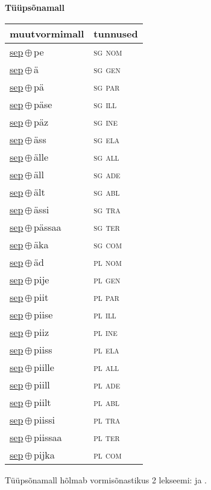 

\vspace{3.5em}
\noindent \begin{minipage}{\textwidth}
\noindent \textbf{Tüüpsõnamall \,}\\

\begin{sideways}
\begin{tabular}{l l}
muutvormimall & tunnused \\
\hline
\underline{sep}\,$\oplus$\,pe & \textsc{ sg nom } \\
\underline{sep}\,$\oplus$\,ä & \textsc{ sg gen } \\
\underline{sep}\,$\oplus$\,pä & \textsc{ sg par } \\
\underline{sep}\,$\oplus$\,päse & \textsc{ sg ill } \\
\underline{sep}\,$\oplus$\,päz & \textsc{ sg ine } \\
\underline{sep}\,$\oplus$\,äss & \textsc{ sg ela } \\
\underline{sep}\,$\oplus$\,älle & \textsc{ sg all } \\
\underline{sep}\,$\oplus$\,äll & \textsc{ sg ade } \\
\underline{sep}\,$\oplus$\,ält & \textsc{ sg abl } \\
\underline{sep}\,$\oplus$\,ässi & \textsc{ sg tra } \\
\underline{sep}\,$\oplus$\,pässaa & \textsc{ sg ter } \\
\underline{sep}\,$\oplus$\,äka & \textsc{ sg com } \\
\underline{sep}\,$\oplus$\,äd & \textsc{ pl nom } \\
\underline{sep}\,$\oplus$\,pije & \textsc{ pl gen } \\
\underline{sep}\,$\oplus$\,piit & \textsc{ pl par } \\
\underline{sep}\,$\oplus$\,piise & \textsc{ pl ill } \\
\underline{sep}\,$\oplus$\,piiz & \textsc{ pl ine } \\
\underline{sep}\,$\oplus$\,piiss & \textsc{ pl ela } \\
\underline{sep}\,$\oplus$\,piille & \textsc{ pl all } \\
\underline{sep}\,$\oplus$\,piill & \textsc{ pl ade } \\
\underline{sep}\,$\oplus$\,piilt & \textsc{ pl abl } \\
\underline{sep}\,$\oplus$\,piissi & \textsc{ pl tra } \\
\underline{sep}\,$\oplus$\,piissaa & \textsc{ pl ter } \\
\underline{sep}\,$\oplus$\,pijka & \textsc{ pl com } \\
\end{tabular}
\end{sideways}
\label{tab:tüüpsõnamall-seppe}

\end{minipage}

 
\vspace{1em}
\noindent Tüüpsõnamall  hõlmab vormisõnastikus 2 lekseemi:  ja .
